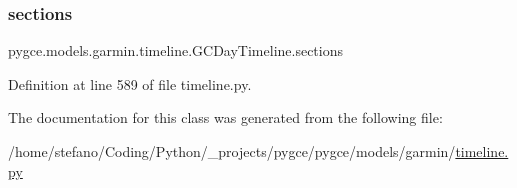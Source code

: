 \subsubsection{\texorpdfstring{sections}{sections}}
{\footnotesize\ttfamily pygce.\+models.\+garmin.\+timeline.\+G\+C\+Day\+Timeline.\+sections}



Definition at line 589 of file timeline.\+py.



The documentation for this class was generated from the following file\+:\begin{DoxyCompactItemize}
\item 
/home/stefano/\+Coding/\+Python/\+\_\+projects/pygce/pygce/models/garmin/\hyperlink{timeline_8py}{timeline.\+py}\end{DoxyCompactItemize}
